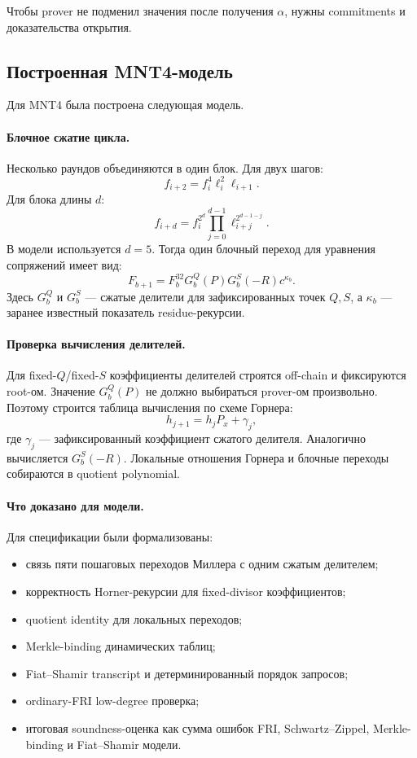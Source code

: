 \documentclass[12pt,a4paper]{article}
\begin{document}
Чтобы prover не подменил значения после получения $\alpha$, нужны commitments
и доказательства открытия.

\subsection{Построенная MNT4-модель}

Для MNT4 была построена следующая модель.

\paragraph{Блочное сжатие цикла.}
Несколько раундов объединяются в один блок. Для двух шагов:
\[
    f_{i+2}
    =
    f_i^4\ell_i^2\ell_{i+1}.
\]
Для блока длины $d$:
\[
    f_{i+d}
    =
    f_i^{2^d}
    \prod_{j=0}^{d-1}\ell_{i+j}^{2^{d-1-j}}.
\]
В модели используется $d=5$. Тогда один блочный переход для уравнения
сопряжений имеет вид:
\[
    F_{b+1}
    =
    F_b^{32}
    G_b^Q(P)
    G_b^S(-R)
    c^{\kappa_b}.
\]
Здесь $G_b^Q$ и $G_b^S$ --- сжатые делители для зафиксированных точек
$Q,S$, а $\kappa_b$ --- заранее известный показатель residue-рекурсии.

\paragraph{Проверка вычисления делителей.}
Для fixed-$Q$/fixed-$S$ коэффициенты делителей строятся off-chain и
фиксируются root-ом. Значение $G_b^Q(P)$ не должно выбираться prover-ом
произвольно. Поэтому строится таблица вычисления по схеме Горнера:
\[
    h_{j+1}=h_j P_x+\gamma_j,
\]
где $\gamma_j$ --- зафиксированный коэффициент сжатого делителя. Аналогично
вычисляется $G_b^S(-R)$. Локальные отношения Горнера и блочные переходы
собираются в quotient polynomial.

\paragraph{Что доказано для модели.}
Для спецификации были формализованы:
\begin{itemize}
    \item связь пяти пошаговых переходов Миллера с одним сжатым делителем;
    \item корректность Horner-рекурсии для fixed-divisor коэффициентов;
    \item quotient identity для локальных переходов;
    \item Merkle-binding динамических таблиц;
    \item Fiat--Shamir transcript и детерминированный порядок запросов;
    \item ordinary-FRI low-degree проверка;
    \item итоговая soundness-оценка как сумма ошибок FRI,
    Schwartz--Zippel, Merkle-binding и Fiat--Shamir модели.
\end{itemize}
\end{document}
